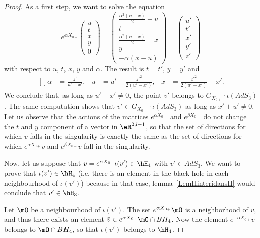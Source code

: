 \begin{proof}
	As a first step, we want to solve the equation
	\begin{equation}
		e^{\alpha X_{0+}}\begin{pmatrix}
			u	\\
			t	\\
			x	\\
			y	\\
			0
		\end{pmatrix}=
		\begin{pmatrix}
			\frac{ \alpha^2(u-x) }{2}+u	\\
			t	\\
			\frac{ \alpha^2(u-x) }{2}+x	\\
			y	\\
			-\alpha(x-u)
		\end{pmatrix}=\begin{pmatrix}
			u'	\\
			t'	\\
			x'	\\
			y'	\\
			z'
		\end{pmatrix}
	\end{equation}
	with respect to $u$, $t$, $x$, $y$ and $\alpha$. The result is $t=t'$, $y=y'$ and
	\begin{equation}
		\begin{aligned}[]
			\alpha&=\frac{ z' }{ u'-x' },&u&=u'-\frac{ z'^2 }{ 2(u'-x') },&x&=\frac{ z'^2 }{ 2(u'-x') }-x'.
		\end{aligned}
	\end{equation}
	We conclude that, as long as $u'-x'\neq 0$, the point $v'$ belongs to $G_{X_{0+}}\cdot\iota(AdS_3)$. The same computation shows that $v'\in G_{X_{0-}}\cdot\iota(AdS_3)$ as long as $x'+u'\neq 0$. Let us observe that the actions of the matrices $ e^{\alpha X_{0+}}$ and $ e^{\beta X_{0-}}$ do not change the $t$ and $y$ component of a vector in $\eR^{2,l-1}$, so that the set of directions for which $v$ falls in the singularity is exactly the same as the set of directions for which $ e^{\alpha X_{0+}}v$ and $ e^{\beta X_{0-}}v$ fall in the singularity.

	Now, let us suppose that $v= e^{\alpha X_{0+}}\iota(v')\in\hH_4$ with $v'\in AdS_3$. We want to prove that $\iota(v')\in\hH_4$ (i.e. there is an element in the black hole in each neighbourhood of $\iota(v')$) because in that case, lemma~\ref{LemHinteridansH} would conclude that $v'\in\hH_3$.

	Let $\mO$ be a neighbourhood of $\iota(v')$. The set $ e^{\alpha X_{0+}}\mO$ is a neighborhood of $v$, and thus there exists an element $\bar v\in e^{\alpha X_{0+}}\mO\cap BH_4$. Now the element $ e^{-\alpha X_{0+}}\bar v$ belongs to $\mO\cap BH_4$, so that $\iota(v')$ belongs to $\hH_4$.
\end{proof}

